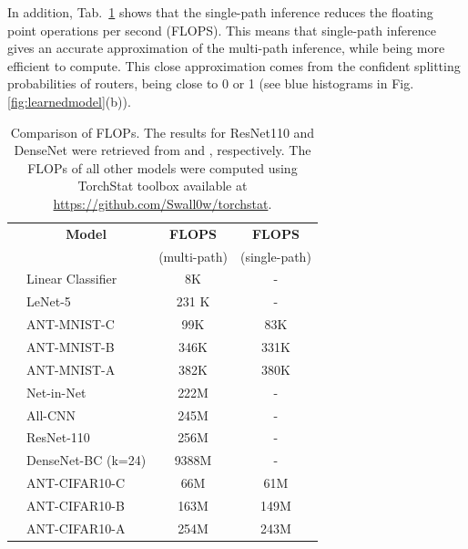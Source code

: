 In addition, Tab.~\ref{tab:flops} shows that the single-path inference reduces the floating point operations per second (FLOPS). This means that single-path inference gives an accurate approximation of the multi-path inference, while being more efficient to compute. This close approximation comes from the confident splitting probabilities of routers, being close to 0 or 1 (see blue histograms in Fig. \ref{fig:learnedmodel}(b)).

\begin{table}[h]
	\caption{\small Comparison of FLOPs. The results for ResNet110 and DenseNet were retrieved from \cite{guan2017energy} and \cite{huang2018condensenet}, respectively. The FLOPs of all other models were computed using TorchStat toolbox available at \url{https://github.com/Swall0w/torchstat}.  \label{tab:flops}}
	\vspace{-5mm}
	\footnotesize
	\center
	\begin{tabular}{|c|l|c|c|}
		\hline
		&\multicolumn{1}{|c}{\textbf{Model}} &  \multicolumn{1}{|c|}{\textbf{FLOPS}} & \multicolumn{1}{c|}{\textbf{FLOPS}}  \\
		& &(multi-path) & (single-path)  \\
		\hline
		\parbox[t]{2mm}{}
		&Linear Classifier & 8K & -   \\
		&LeNet-5 & 231 K & -  \\
		&ANT-MNIST-C & 99K & 83K  \\
		&ANT-MNIST-B & 346K & 331K \\
		&ANT-MNIST-A & 382K & 380K  \\
		\hline
		
		\parbox[t]{2mm}{}&Net-in-Net & 222M &- \\
		&All-CNN & 245M & -\\
		&ResNet-110 & 256M&- \\
		&DenseNet-BC (k=24)& 9388M &- \\
		&ANT-CIFAR10-C & 66M & 61M  \\
		&ANT-CIFAR10-B & 163M & 149M  \\
		&ANT-CIFAR10-A & 254M & 243M  \\
		\hline
	\end{tabular}
\end{table}


